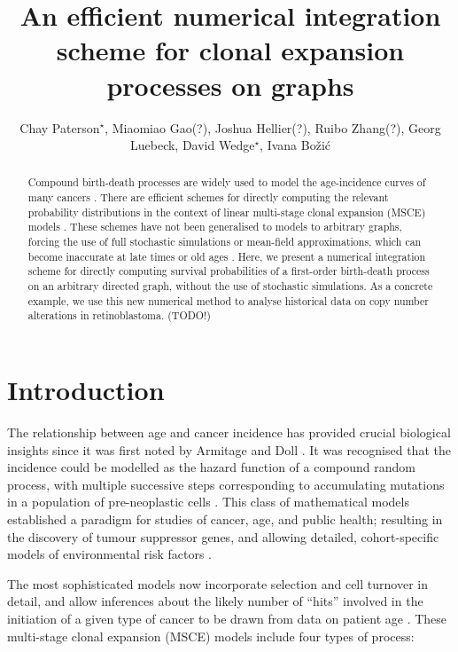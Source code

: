 \documentclass{article}
\title{An efficient numerical integration scheme for clonal expansion processes on graphs}
\author{Chay Paterson${}^\star$, Miaomiao Gao(?), Joshua Hellier(?), Ruibo Zhang(?), Georg Luebeck, David Wedge${}^\star$, Ivana Bo\v{z}i\'{c}}
\begin{document}
\maketitle

\begin{abstract}
Compound birth-death processes are widely used to model the age-incidence curves
of many cancers \cite{luebeck2013impact}. There are efficient schemes for
directly computing the relevant %
probability distributions in the context of linear multi-stage clonal expansion
(MSCE) models \cite{meza2008age}. These schemes have not been generalised to
models to arbitrary graphs, forcing the use of full stochastic simulations or
mean-field approximations, which can become inaccurate at late times or old ages
\cite{patersonbozic2020colorectal,Paterson2021vs}.
Here, we present a numerical integration scheme for directly computing survival
probabilities of a first-order birth-death process on an arbitrary
directed graph, without the use of stochastic
simulations. As a concrete example, we use this new numerical method to analyse
historical data on copy number alterations in retinoblastoma. (TODO!)
\end{abstract}

\section{Introduction}

The relationship between age and cancer incidence has provided crucial
biological insights since it was first noted by Armitage and Doll
\cite{armitage_doll,armitage1957two,knudson1971mutation}. It was 
recognised that the incidence could be modelled as the hazard function of a
compound random process, with multiple successive steps corresponding to
accumulating mutations in a population of pre-neoplastic cells
\cite{armitage_doll,moolgavkar1979two}. This class of mathematical models
established a paradigm for studies of cancer, age, and public health; resulting
in the discovery of tumour suppressor genes, and allowing detailed,
cohort-specific models of environmental risk factors
\cite{knudson1971mutation,conolly2003biologically,meza2008age}. 

The most sophisticated
models now incorporate selection and cell turnover in detail, and allow
inferences about the likely number of ``hits'' involved in the initiation of a
given type of cancer to be drawn from data on patient age \cite{moolgavkar1992multistage,luebeck2013impact}. These multi-stage clonal expansion (MSCE) models include four types of process:
\end{document}
